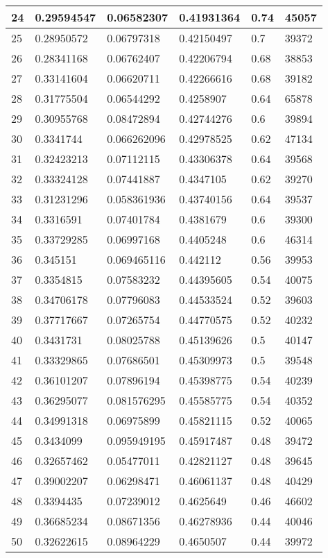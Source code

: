\begin{longtable}{|l|l|l|l|l|l|}
24 & 0.29594547 & 0.06582307 & 0.41931364 & 0.74 & 45057 \\ \hline 
25 & 0.28950572 & 0.06797318 & 0.42150497 & 0.7 & 39372 \\ \hline 
26 & 0.28341168 & 0.06762407 & 0.42206794 & 0.68 & 38853 \\ \hline 
27 & 0.33141604 & 0.06620711 & 0.42266616 & 0.68 & 39182 \\ \hline 
28 & 0.31775504 & 0.06544292 & 0.4258907 & 0.64 & 65878 \\ \hline 
29 & 0.30955768 & 0.08472894 & 0.42744276 & 0.6 & 39894 \\ \hline 
30 & 0.3341744 & 0.066262096 & 0.42978525 & 0.62 & 47134 \\ \hline 
31 & 0.32423213 & 0.07112115 & 0.43306378 & 0.64 & 39568 \\ \hline 
32 & 0.33324128 & 0.07441887 & 0.4347105 & 0.62 & 39270 \\ \hline 
33 & 0.31231296 & 0.058361936 & 0.43740156 & 0.64 & 39537 \\ \hline 
34 & 0.3316591 & 0.07401784 & 0.4381679 & 0.6 & 39300 \\ \hline 
35 & 0.33729285 & 0.06997168 & 0.4405248 & 0.6 & 46314 \\ \hline 
36 & 0.345151 & 0.069465116 & 0.442112 & 0.56 & 39953 \\ \hline 
37 & 0.3354815 & 0.07583232 & 0.44395605 & 0.54 & 40075 \\ \hline 
38 & 0.34706178 & 0.07796083 & 0.44533524 & 0.52 & 39603 \\ \hline 
39 & 0.37717667 & 0.07265754 & 0.44770575 & 0.52 & 40232 \\ \hline 
40 & 0.3431731 & 0.08025788 & 0.45139626 & 0.5 & 40147 \\ \hline 
41 & 0.33329865 & 0.07686501 & 0.45309973 & 0.5 & 39548 \\ \hline 
42 & 0.36101207 & 0.07896194 & 0.45398775 & 0.54 & 40239 \\ \hline 
43 & 0.36295077 & 0.081576295 & 0.45585775 & 0.54 & 40352 \\ \hline 
44 & 0.34991318 & 0.06975899 & 0.45821115 & 0.52 & 40065 \\ \hline 
45 & 0.3434099 & 0.095949195 & 0.45917487 & 0.48 & 39472 \\ \hline 
46 & 0.32657462 & 0.05477011 & 0.42821127 & 0.48 & 39645 \\ \hline 
47 & 0.39002207 & 0.06298471 & 0.46061137 & 0.48 & 40429 \\ \hline 
48 & 0.3394435 & 0.07239012 & 0.4625649 & 0.46 & 46602 \\ \hline 
49 & 0.36685234 & 0.08671356 & 0.46278936 & 0.44 & 40046 \\ \hline 
50 & 0.32622615 & 0.08964229 & 0.4650507 & 0.44 & 39972 \\ \hline 
\end{longtable}
